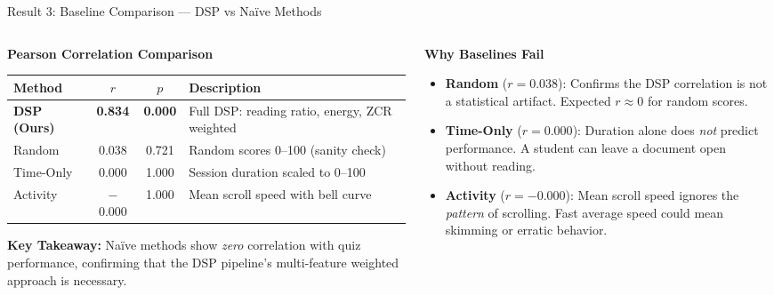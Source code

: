 \documentclass[aspectratio=169,10pt]{beamer}
\begin{document}
\begin{frame}{Result 3: Baseline Comparison --- DSP vs Na\"ive Methods}
\begin{columns}[T]
\begin{column}{0.55\textwidth}
\textbf{Pearson Correlation Comparison}

\vspace{6pt}
\begin{center}
\begin{tabular}{@{}lccp{3.5cm}@{}}
\toprule
\textbf{Method} & $r$ & $p$ & \textbf{Description} \\
\midrule
\rowcolor{cpugreen!15}
\textbf{DSP (Ours)} & \textbf{0.834} & \textbf{0.000} & Full DSP: reading ratio, energy, ZCR weighted \\[4pt]
Random & 0.038 & 0.721 & Random scores 0--100 (sanity check) \\[4pt]
Time-Only & 0.000 & 1.000 & Session duration scaled to 0--100 \\[4pt]
Activity & $-$0.000 & 1.000 & Mean scroll speed with bell curve \\
\bottomrule
\end{tabular}
\end{center}

\vspace{8pt}
\footnotesize
\textbf{Key Takeaway:} Na\"ive methods show \textit{zero} correlation with quiz performance, confirming that the DSP pipeline's multi-feature weighted approach is necessary.
\end{column}

\begin{column}{0.42\textwidth}
\textbf{Why Baselines Fail}

\vspace{6pt}
\footnotesize
\begin{itemize}\scriptsize
  \item \textbf{Random} ($r=0.038$): Confirms the DSP correlation is not a statistical artifact. Expected $r \approx 0$ for random scores.

  \item \textbf{Time-Only} ($r=0.000$): Duration alone does \textit{not} predict performance. A student can leave a document open without reading.

  \item \textbf{Activity} ($r=-0.000$): Mean scroll speed ignores the \textit{pattern} of scrolling. Fast average speed could mean skimming or erratic behavior.


\end{itemize}
\end{column}
\end{columns}
\end{frame}
\end{document}
